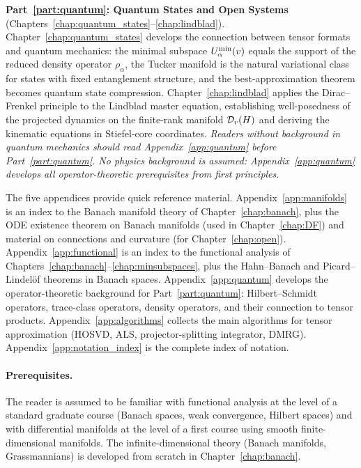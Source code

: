\textbf{Part~\ref{part:quantum}: Quantum States and Open Systems}
(Chapters~\ref{chap:quantum_states}--\ref{chap:lindblad}).
Chapter~\ref{chap:quantum_states} develops the connection between
tensor formats and quantum mechanics: the minimal subspace
$U^{\min}_{\alpha}(v)$ equals the support of the reduced density operator
$\rho_\alpha$, the Tucker manifold is the natural variational class for
states with fixed entanglement structure, and the best-approximation
theorem becomes quantum state compression. Chapter~\ref{chap:lindblad}
applies the Dirac--Frenkel principle to the Lindblad master equation,
establishing well-posedness of the projected dynamics on the finite-rank
manifold $\mathcal{D}_{r}(H)$ and deriving the kinematic equations in
Stiefel-core coordinates.
\emph{Readers without background in quantum mechanics should read
Appendix~\ref{app:quantum} before Part~\ref{part:quantum}.
No physics background is assumed: Appendix~\ref{app:quantum} develops
all operator-theoretic prerequisites from first principles.}

The five appendices provide quick reference material.
Appendix~\ref{app:manifolds} is an index to the Banach manifold theory
of Chapter~\ref{chap:banach}, plus the ODE existence theorem on Banach
manifolds (used in Chapter~\ref{chap:DF}) and material on connections and
curvature (for Chapter~\ref{chap:open}).
Appendix~\ref{app:functional} is an index to the functional analysis
of Chapters~\ref{chap:banach}--\ref{chap:minsubspaces}, plus the
Hahn--Banach and Picard--Lindelöf theorems in Banach spaces.
Appendix~\ref{app:quantum} develops the operator-theoretic background
for Part~\ref{part:quantum}: Hilbert--Schmidt operators, trace-class
operators, density operators, and their connection to tensor products.
Appendix~\ref{app:algorithms} collects the main algorithms for tensor
approximation (HOSVD, ALS, projector-splitting integrator, DMRG).
Appendix~\ref{app:notation_index} is the complete index of notation.

\paragraph{Prerequisites.} The reader is assumed to be familiar with
functional analysis at the level of a standard graduate course (Banach
spaces, weak convergence, Hilbert spaces) and with differential
manifolds at the level of a first course using smooth finite-dimensional
manifolds. The infinite-dimensional theory (Banach manifolds,
Grassmannians) is developed from scratch in Chapter~\ref{chap:banach}.

